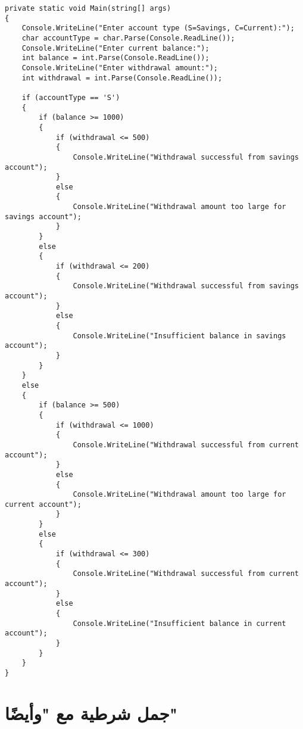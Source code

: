 \documentclass[12pt]{article}
\begin{document}
\begin{enumerate}[itemsep=3em]
\begin{enumerate}[itemsep=3em]
\begin{enumerate}
\ifwithsols
\begin{solution}
\begin{english}
\begin{lstlisting}
private static void Main(string[] args)
{
    Console.WriteLine("Enter account type (S=Savings, C=Current):");
    char accountType = char.Parse(Console.ReadLine());
    Console.WriteLine("Enter current balance:");
    int balance = int.Parse(Console.ReadLine());
    Console.WriteLine("Enter withdrawal amount:");
    int withdrawal = int.Parse(Console.ReadLine());

    if (accountType == 'S')
    {
        if (balance >= 1000)
        {
            if (withdrawal <= 500)
            {
                Console.WriteLine("Withdrawal successful from savings account");
            }
            else
            {
                Console.WriteLine("Withdrawal amount too large for savings account");
            }
        }
        else
        {
            if (withdrawal <= 200)
            {
                Console.WriteLine("Withdrawal successful from savings account");
            }
            else
            {
                Console.WriteLine("Insufficient balance in savings account");
            }
        }
    }
    else
    {
        if (balance >= 500)
        {
            if (withdrawal <= 1000)
            {
                Console.WriteLine("Withdrawal successful from current account");
            }
            else
            {
                Console.WriteLine("Withdrawal amount too large for current account");
            }
        }
        else
        {
            if (withdrawal <= 300)
            {
                Console.WriteLine("Withdrawal successful from current account");
            }
            else
            {
                Console.WriteLine("Insufficient balance in current account");
            }
        }
    }
}
\end{lstlisting}
\end{english}
\end{solution}
\clearpage
\fi
\fi

\end{enumerate}

\section{جمل شرطية مع "وأيضًا"}

\ifdetailed
\begin{enumerate}[itemsep=3em]
\else
\begin{enumerate}
\fi


\end{enumerate}
\end{enumerate}
\end{enumerate}
\end{enumerate}
\end{document}
